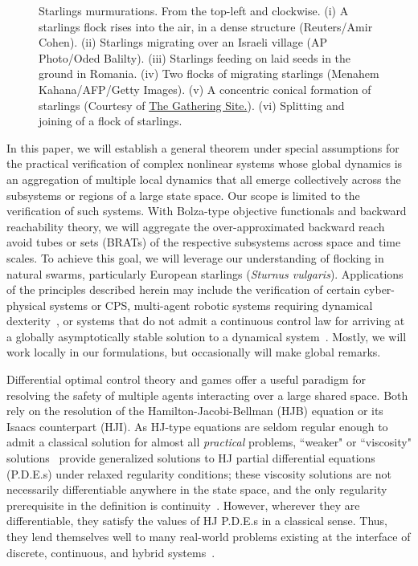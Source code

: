 \begin{figure}[tb!]
\begin{tabular}{ccc}
	\end{tabular}
	\caption{Starlings murmurations. From the top-left and clockwise. (i) A starlings flock rises into the air, in a dense structure (Reuters/Amir Cohen).  (ii) Starlings migrating over an Israeli village (AP Photo/Oded Balilty). (iii) Starlings feeding on laid seeds  in the ground in Romania. (iv) Two flocks of migrating starlings (Menahem Kahana/AFP/Getty Images). (v) A concentric conical formation of starlings (Courtesy of \href{http://www.thegatheringsite.net/qcgems/2014/1/24/murmuration}{The Gathering Site.}). (vi)  Splitting and joining of a flock of starlings.} 
	\label{fig:murmurations}
\end{figure}

In this paper, we will establish a general theorem under special assumptions for the practical verification of complex nonlinear systems whose global dynamics is an aggregation of multiple local dynamics that all emerge collectively across the  subsystems or regions of a large state space. Our scope is limited to the verification of such systems. With Bolza-type objective functionals and backward reachability theory, we will aggregate the over-approximated  backward reach avoid tubes or sets (BRATs) of the respective subsystems across space and time scales.  To achieve this goal, we will leverage our understanding of flocking in natural swarms, particularly European starlings (\textit{Sturnus vulgaris}). Applications of the principles described herein may include the verification of certain cyber-physical systems or CPS, multi-agent robotic systems requiring dynamical dexterity~\cite{SeqCompKoditschek}, or  systems that do not admit a continuous control law for arriving at a globally asymptotically stable solution to a dynamical system~\cite{Brockett83}.  Mostly, we will work locally in our formulations, but occasionally will make global remarks. 

Differential optimal control theory and games offer a useful paradigm for resolving the safety of multiple agents interacting over a large shared space. Both rely on the resolution of the Hamilton-Jacobi-Bellman (HJB) equation or its Isaacs counterpart (HJI).  As HJ-type equations are seldom regular enough to admit a classical solution for almost all \textit{practical} problems, ``weaker" or ``viscosity" solutions~\cite{Lions1982, Evans1984, Crandall1984} provide generalized  solutions to HJ partial differential equations (P.D.E.s) under relaxed regularity conditions; these viscosity solutions are not necessarily differentiable anywhere in the state space, and the only regularity prerequisite in the definition is continuity~\cite{Crandall1983viscosity}. However, wherever they are differentiable, they satisfy the  values of HJ P.D.E.s in a classical sense. Thus, they lend themselves well to many real-world problems existing at the interface of discrete, continuous, and hybrid systems~\cite{LygerosReachability,  Mitchell2020, Souganidis, Mitchell2005}.

